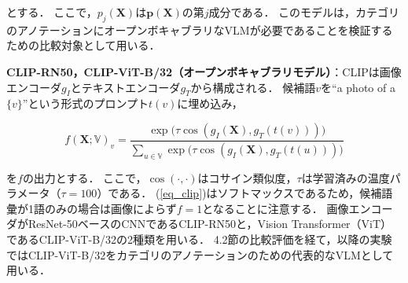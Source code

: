 \noindent
とする．
ここで，$ p_j({\mathbf X}) $は$ {\mathbf p}({\mathbf X}) $の第$ j $成分である．
このモデルは，カテゴリのアノテーションにオープンボキャブラリなVLMが必要であることを検証するための比較対象として用いる．

{\bf CLIP-RN50，CLIP-ViT-B/32（オープンボキャブラリモデル）}：CLIP\cite{ref_CLIP}は画像エンコーダ$ g_I $とテキストエンコーダ$ g_T $から構成される．
候補語$ v $を``a photo of a $ \{v\} $''という形式のプロンプト$ t(v) $に埋め込み，

\begin{equation}
    f({\mathbf X}; {\mathbb V})_v =
    \frac{\exp \bigl( \tau \cos( g_I({\mathbf X}), g_T(t(v)) ) \bigr)}
         {\sum_{u \in {\mathbb V}} \exp \bigl( \tau \cos( g_I({\mathbf X}), g_T(t(u)) ) \bigr)}
    \label{eq_clip}
\end{equation}

\noindent
を$ f $の出力とする．
ここで，$ \cos(\cdot, \cdot) $はコサイン類似度，$ \tau $は学習済みの温度パラメータ（$ \tau = 100 $）である．
(\ref{eq_clip})はソフトマックスであるため，候補語彙が1語のみの場合は画像によらず$ f = 1 $となることに注意する．
画像エンコーダがResNet-50ベースのCNNであるCLIP-RN50と，Vision Transformer（ViT）\cite{ref_ViT}であるCLIP-ViT-B/32の2種類を用いる．
4.2節の比較評価を経て，以降の実験ではCLIP-ViT-B/32をカテゴリのアノテーションのための代表的なVLMとして用いる．
